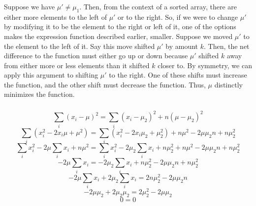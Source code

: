 \documentclass{article}
\begin{document}
\subsubsection{}Suppose we have $\mu' \neq \mu_1$. Then, from the context of a sorted array, there are either more elements to the left of $\mu'$ or to the right. So, if we were to change $\mu'$ by modifying it to be the element to the right or left of it, one of the options makes the expression function described earlier, smaller. Suppose we moved $\mu'$ to the element to the left of it. Say this move shifted $\mu'$ by amount $k$. Then, the net difference to the function must either go up or down because $\mu'$ shifted $k$ away from either more or less elements than it shifted $k$ closer to. By symmetry, we can apply this argument to shifting $\mu'$ to the right. One of these shifts must increase the function, and the other shift must decrease the function. Thus, $\mu$ distinctly minimizes the function.
\subsubsection{}
$$\sum_i(x_i-\mu)^2=\sum_i(x_i-\mu_2)^2+n(\mu-\mu_2)^2$$
$$\sum_i(x_i^2-2x_i\mu+\mu^2)=\sum_i(x_i^2-2x_i\mu_2+\mu_2^2)+n\mu^2-2\mu\mu_2n+n\mu_2^2$$
$$\sum_ix_i^2-2\mu\sum_ix_i+n\mu^2=\sum_ix_i^2-2\mu_2\sum_ix_i+n\mu_2^2+n\mu^2-2\mu\mu_2n+n\mu_2^2$$
$$-2\mu\sum_ix_i=-2\mu_2\sum_ix_i+n\mu_2^2-2\mu\mu_2n+n\mu_2^2$$
$$-2\mu\sum_ix_i+2\mu_2\sum_ix_i=2n\mu_2^2-2\mu\mu_2n$$
$$-2\mu\mu_2+2\mu_2\mu_2=2\mu_2^2-2\mu\mu_2$$
$$0=0$$
\subsubsection{}
\end{document}
